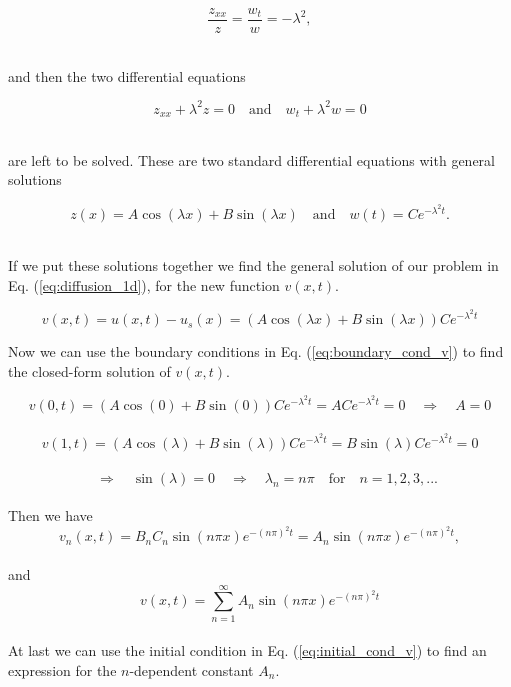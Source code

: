 \documentclass[12pt]{article}
\begin{document}
\begin{flushleft}
\vspace{5mm}
$$\frac{z_{xx}}{z} = \frac{w_t}{w} = -\lambda^2,$$\\
\vspace{5mm}

and then the two differential equations 

\vspace{5mm}
$$z_{xx} + \lambda^2 z = 0 \quad\text{and}\quad w_t + \lambda^2 w = 0$$\\
\vspace{5mm}

are left to be solved. These are two standard differential equations with general solutions

\vspace{5mm}
$$z(x) = A\cos(\lambda x) + B\sin(\lambda x)\quad\text{and}\quad w(t) = Ce^{-\lambda^2 t}.$$\\
\vspace{5mm}

If we put these solutions together we find the general solution of our problem in Eq. (\ref{eq:diffusion_1d}), for the new function $v(x,t)$.

\vspace{5mm}
\begin{equation}
v(x,t) = u(x,t) - u_s(x) = \left(A\cos(\lambda x) + B\sin(\lambda x)\right)Ce^{-\lambda^2 t}
\end{equation}
\vspace{5mm}

Now we can use the boundary conditions in Eq. (\ref{eq:boundary_cond_v}) to find the closed-form solution of $v(x,t)$.

\vspace{5mm}
$$v(0,t) = \left(A\cos(0) + B\sin(0)\right)Ce^{-\lambda^2 t} = ACe^{-\lambda^2 t} = 0 \quad\Rightarrow\quad A = 0$$\\
$$v(1,t) = \left(A\cos(\lambda) + B\sin(\lambda)\right)Ce^{-\lambda^2 t} = B\sin(\lambda)Ce^{-\lambda^2 t} = 0$$\\
$$\quad\Rightarrow\quad \sin(\lambda) = 0 \quad\Rightarrow\quad \lambda_n = n\pi\quad\text{for}\quad n = 1,2,3,...$$\\
\vspace{5mm}
Then we have 
\vspace{5mm}
$$v_n(x,t) = B_nC_n\sin(n\pi x)e^{-(n\pi)^2t} = A_n\sin(n\pi x)e^{-(n\pi)^2t},$$\\
and
$$v(x,t) = \sum\limits_{n=1}^{\infty}A_n\sin(n\pi x)e^{-(n\pi)^2t}$$\\
\vspace{5mm}
At last we can use the initial condition in Eq. (\ref{eq:initial_cond_v}) to find an expression for the $n$-dependent constant $A_n$.


\end{flushleft}
\end{document}

